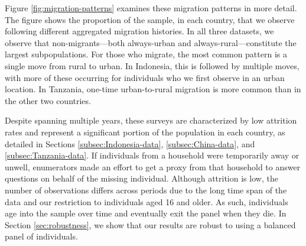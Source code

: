 \documentclass[12pt]{article}
\begin{document}
Figure \ref{fig:migration-patterns} examines these migration patterns in more detail.
The figure shows the proportion of the sample, in each country, that we observe following different aggregated migration histories.
In all three datasets, we observe that non-migrants---both always-urban and always-rural---constitute the largest subpopulations.
For those who migrate, the most common pattern is a single move from rural to urban. 
In Indonesia, this is followed by multiple moves, with more of these occurring for individuals who we first observe in an urban location.
In Tanzania, one-time urban-to-rural migration is more common than in the other two countries.

Despite spanning multiple years, these surveys are characterized by low attrition rates and represent a significant portion of the population in each country, as detailed in Sections \ref{subsec:Indonesia-data}, \ref{subsec:China-data}, and \ref{subsec:Tanzania-data}. 
If individuals from a household were temporarily away or unwell, enumerators made an effort to get a proxy from that household to answer questions on behalf of the missing individual. Although attrition is low, the number of observations differs across periods due to the long time span of the data and our restriction to individuals aged 16 and older. As such, individuals age into the sample over time and eventually exit the panel when they die. In Section \ref{sec:robustness}, we show that our results are robust to using a balanced panel of individuals.
\end{document}
